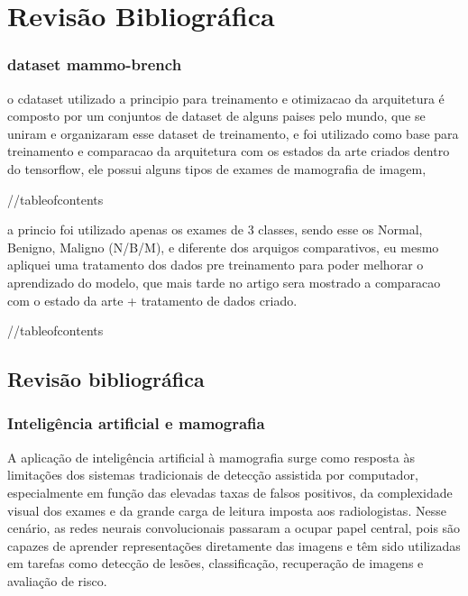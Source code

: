 \chapter{Revisão Bibliográfica}
\label{cap:revisao}

\subsection{dataset mammo-brench}

o cdataset utilizado a principio para treinamento e otimizacao da arquitetura é composto por um conjuntos de dataset de alguns paises pelo mundo, que se uniram e organizaram esse dataset de treinamento, e foi utilizado como base para treinamento e comparacao da arquitetura com os estados da arte criados dentro do tensorflow, ele possui alguns tipos de exames de mamografia de imagem, 

//tableofcontents

a princio foi utilizado apenas os exames de 3 classes, sendo esse os Normal, Benigno, Maligno (N/B/M), e diferente dos arquigos comparativos, eu mesmo apliquei uma tratamento dos dados pre treinamento para poder melhorar o aprendizado do modelo, que mais tarde no artigo sera mostrado a comparacao com o estado da arte + tratamento de dados criado. 

//tableofcontents




\section{Revisão bibliográfica}

\subsection{Inteligência artificial e mamografia}

A aplicação de inteligência artificial à mamografia surge como resposta às limitações dos sistemas tradicionais de detecção assistida por computador, especialmente em função das elevadas taxas de falsos positivos, da complexidade visual dos exames e da grande carga de leitura imposta aos radiologistas. Nesse cenário, as redes neurais convolucionais passaram a ocupar papel central, pois são capazes de aprender representações diretamente das imagens e têm sido utilizadas em tarefas como detecção de lesões, classificação, recuperação de imagens e avaliação de risco.

